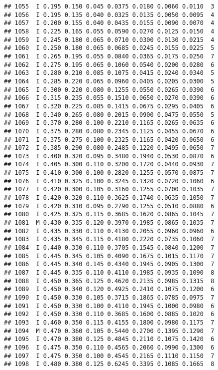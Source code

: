 \documentclass[
]{article}
\begin{document}
\begin{verbatim}
## 1055  I 0.195 0.150 0.045 0.0375 0.0180 0.0060 0.0110  3
## 1056  I 0.195 0.135 0.040 0.0325 0.0135 0.0050 0.0095  4
## 1057  I 0.200 0.155 0.040 0.0435 0.0155 0.0090 0.0070  4
## 1058  I 0.225 0.165 0.055 0.0590 0.0270 0.0125 0.0150  4
## 1059  I 0.245 0.180 0.065 0.0710 0.0300 0.0130 0.0215  4
## 1060  I 0.250 0.180 0.065 0.0685 0.0245 0.0155 0.0225  5
## 1061  I 0.265 0.195 0.055 0.0840 0.0365 0.0175 0.0250  7
## 1062  I 0.275 0.195 0.065 0.1060 0.0540 0.0200 0.0280  6
## 1063  I 0.280 0.210 0.085 0.1075 0.0415 0.0240 0.0340  5
## 1064  I 0.285 0.220 0.065 0.0960 0.0405 0.0205 0.0300  5
## 1065  I 0.300 0.220 0.080 0.1255 0.0550 0.0265 0.0390  6
## 1066  I 0.315 0.235 0.055 0.1510 0.0650 0.0270 0.0390  6
## 1067  I 0.320 0.225 0.085 0.1415 0.0675 0.0295 0.0405  6
## 1068  I 0.340 0.265 0.080 0.2015 0.0900 0.0475 0.0550  5
## 1069  I 0.370 0.280 0.100 0.2210 0.1165 0.0265 0.0635  6
## 1070  I 0.375 0.280 0.080 0.2345 0.1125 0.0455 0.0670  6
## 1071  I 0.375 0.275 0.100 0.2325 0.1165 0.0420 0.0650  6
## 1072  I 0.385 0.290 0.080 0.2485 0.1220 0.0495 0.0650  7
## 1073  I 0.400 0.320 0.095 0.3480 0.1940 0.0530 0.0870  6
## 1074  I 0.405 0.300 0.110 0.3200 0.1720 0.0440 0.0930  7
## 1075  I 0.410 0.300 0.100 0.2820 0.1255 0.0570 0.0875  7
## 1076  I 0.410 0.325 0.100 0.3245 0.1320 0.0720 0.1060  6
## 1077  I 0.420 0.300 0.105 0.3160 0.1255 0.0700 0.1035  7
## 1078  I 0.420 0.320 0.110 0.3625 0.1740 0.0635 0.1050  7
## 1079  I 0.420 0.310 0.095 0.2790 0.1255 0.0510 0.0880  6
## 1080  I 0.425 0.325 0.115 0.3685 0.1620 0.0865 0.1045  7
## 1081  M 0.430 0.335 0.120 0.3970 0.1985 0.0865 0.1035  7
## 1082  I 0.435 0.330 0.110 0.4130 0.2055 0.0960 0.0960  6
## 1083  I 0.435 0.345 0.115 0.4180 0.2220 0.0735 0.1060  7
## 1084  I 0.440 0.330 0.110 0.3705 0.1545 0.0840 0.1200  7
## 1085  I 0.445 0.345 0.105 0.4090 0.1675 0.1015 0.1170  7
## 1086  I 0.445 0.340 0.145 0.4340 0.1945 0.0905 0.1300  7
## 1087  I 0.445 0.335 0.110 0.4110 0.1985 0.0935 0.1090  8
## 1088  I 0.450 0.365 0.125 0.4620 0.2135 0.0985 0.1315  8
## 1089  I 0.450 0.340 0.120 0.4925 0.2410 0.1075 0.1200  6
## 1090  I 0.450 0.330 0.105 0.3715 0.1865 0.0785 0.0975  7
## 1091  I 0.450 0.330 0.100 0.4110 0.1945 0.1000 0.0980  6
## 1092  I 0.450 0.330 0.110 0.3685 0.1600 0.0885 0.1020  6
## 1093  I 0.460 0.350 0.115 0.4155 0.1800 0.0980 0.1175  7
## 1094  M 0.470 0.360 0.105 0.5440 0.2700 0.1395 0.1290  7
## 1095  I 0.470 0.380 0.125 0.4845 0.2110 0.1075 0.1420  6
## 1096  I 0.475 0.350 0.110 0.4565 0.2060 0.0990 0.1300  6
## 1097  I 0.475 0.350 0.100 0.4545 0.2165 0.1110 0.1150  7
## 1098  I 0.480 0.380 0.125 0.6245 0.3395 0.1085 0.1665  8

\end{verbatim}
\end{document}
